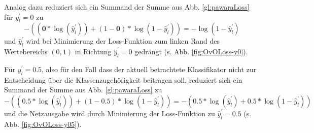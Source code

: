 Analog dazu reduziert sich ein Summand der Summe aus Abb. \ref{gl:pawaraLoss} für $y_{l}^{'} = 0$ zu
\[-((\boldsymbol{0} * \log{(\widehat{y}_{l}^{'})}) + (1 - \boldsymbol{0}) * \log{(1-\widehat{y}_{l}^{'})}) = -\log{(1-\widehat{y}_{l}^{'})}\]
und $\widehat{y}_{l}^{'}$ wird bei Minimierung der Loss-Funktion zum linken Rand des Wertebereichs $(0, 1)$ in Richtung $\widehat{y}_{l}^{'}=0$  gedrängt (s. Abb. \ref{fig:OvOLoss-y0}).

Für $y_{l}^{'} = 0.5$, also für den Fall dass der aktuell betrachtete Klassifikator nicht zur Entscheidung über die Klassenzugehörigkeit beitragen soll, reduziert sich ein Summand der Summe aus Abb. \ref{gl:pawaraLoss} zu
\[-((\boldsymbol{0.5} * \log{(\widehat{y}_{l}^{'})}) + (1 - \boldsymbol{0.5}) * \log{(1-\widehat{y}_{l}^{'})}) = - (0.5 * \log{(\widehat{y}_{l}^{'})} + 0.5 * \log{(1-\widehat{y}_{l}^{'})})\]
und die Netzausgabe wird durch Minimierung der Loss-Funktion zu $\widehat{y}_{l}^{'}=0.5$ (s. Abb. \ref{fig:OvOLoss-y05}).

